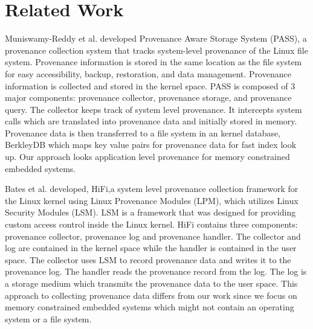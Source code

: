 \documentclass[conference]{IEEEtran}
\begin{document}
%

\section{Related Work}

Muniswamy-Reddy
et al. \cite{muniswamy_reddy} developed Provenance Aware Storage System (PASS), a provenance collection system that tracks  system-level provenance of the Linux file system. Provenance information
is stored in the same location as the file system for easy accessibility, backup,
restoration, and data management. Provenance information is collected and stored in
the kernel space. PASS is composed of 3 major components: provenance collector, provenance storage, and provenance query. The collector keeps track of system level provenance. It intercepts system calls which are translated into provenance data and initially stored in memory. Provenance data is then transferred to a file system in an kernel database, BerkleyDB which maps key value pairs for provenance data for fast index look up. Our approach looks application level provenance for memory constrained embedded systems. 

\par Bates et al. \cite{hi_fi}  developed, HiFi,a system level provenance collection framework for the Linux kernel using Linux Provenance Modules (LPM), which utilizes Linux Security Modules (LSM). LSM is a framework that was designed for providing custom access control inside the Linux kernel. HiFi contains three components: provenance collector, provenance log and provenance handler. The collector and log are contained in the kernel space while the handler is contained in the user space. The collector uses LSM to record provenance data and writes it to the provenance log. The handler reads the provenance record from the log. The log is a storage medium which transmits the provenance data to the user space. This approach to collecting provenance data differs from our work since we focus on memory constrained embedded systems which might not contain an operating system or a file system.

\end{document}
